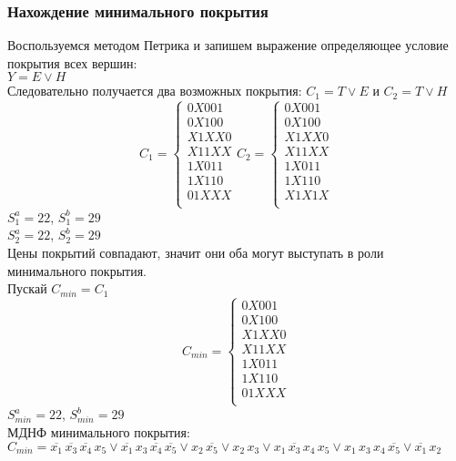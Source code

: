 \documentclass[12pt,a4paper]{report}
\begin{document}
\subsubsection*{Нахождение минимального покрытия}
Воспользуемся методом Петрика и запишем выражение определяющее условие покрытия всех вершин:\\
$Y=E\vee H$\\
Следовательно получается два возможных покрытия: $C_1=T\vee E$ и $C_2=T\vee H$\\
\begin{equation*}
    C_1=
    \begin{cases}
        0X001\\
        0X100\\
        X1XX0\\
        X11XX\\
        1X011\\
        1X110\\
        01XXX\\
    \end{cases}
    C_2=
    \begin{cases}
        0X001\\
        0X100\\
        X1XX0\\
        X11XX\\
        1X011\\
        1X110\\
        X1X1X\\
    \end{cases}
\end{equation*}
$S_1^a=22$, $S_1^b=29$\\
$S_2^a=22$, $S_2^b=29$\\
\hfill\break
Цены покрытий совпадают, значит они оба могут выступать в роли минимального покрытия.\\
\hfill\break
\hfill\break
Пускай $C_{min}=C_1$\\
\begin{equation*}
    C_{min}=
    \begin{cases}
        0X001\\
        0X100\\
        X1XX0\\
        X11XX\\
        1X011\\
        1X110\\
        01XXX\\
    \end{cases}
\end{equation*}
$S_{min}^a=22$, $S_{min}^b=29$\\
\hfill\break
МДНФ минимального покрытия:\\
$C_{min}=\overline{x_1}\,\overline{x_3}\,\overline{x_4}\,x_5\vee\overline{x_1}\,x_3\,\overline{x_4}\,\overline{x_5}\vee x_2\,\overline{x_5}\vee x_2\,x_3\vee x_1\,\overline{x_3}\,x_4\,x_5\vee x_1\,x_3\,x_4\,\overline{x_5}\vee \overline{x_1}\,x_2$
\end{document}
